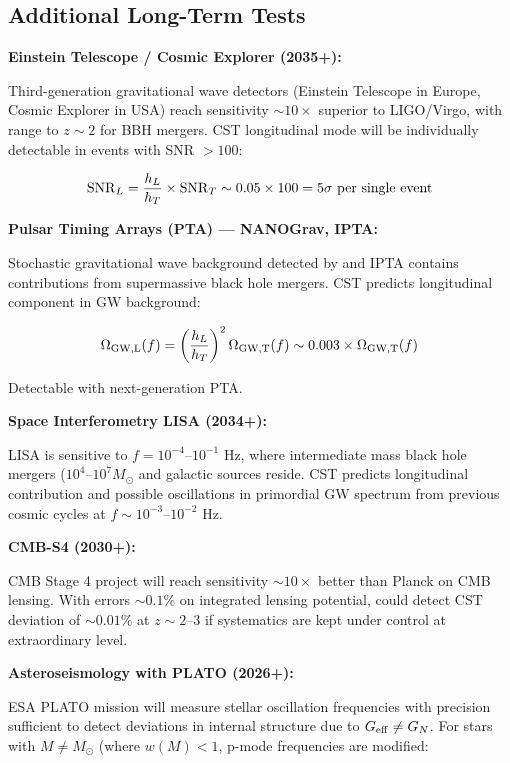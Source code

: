 \documentclass[10pt,a4paper]{article}
\begin{document}
\subsection{Additional Long-Term
Tests}\label{additional-long-term-tests}

\textbf{Einstein Telescope / Cosmic Explorer (2035+):}

Third-generation gravitational wave detectors (Einstein Telescope in
Europe, Cosmic Explorer in USA) reach sensitivity \(\sim 10\times\)
superior to LIGO/Virgo, with range to \(z \sim 2\) for BBH mergers. CST
longitudinal mode will be individually detectable in events with SNR
\(> 100\):

\[{\rm SNR}_L = \frac{h_L}{h_T} \times {\rm SNR}_{T} \sim 0.05 \times 100 = 5\sigma~\text{per single event}\]

\textbf{Pulsar Timing Arrays (PTA) --- NANOGrav, IPTA:}

Stochastic gravitational wave background detected by \cite{NANOGravCollaboration2023} and
IPTA contains contributions from supermassive black hole mergers. CST
predicts longitudinal component in GW background:

\[\Omega_{\rm GW,L}(f) = \left(\frac{h_L}{h_T}\right)^2 \Omega_{\rm GW,T}(f) \sim 0.003 \times \Omega_{\rm GW,T}(f)\]

Detectable with next-generation PTA.

\textbf{Space Interferometry LISA (2034+):}

LISA is sensitive to \(f = 10^{-4}\)--\(10^{-1}\) Hz, where intermediate
mass black hole mergers (\(10^4\)--\(10^7 M_\odot\) and galactic
sources reside. CST predicts longitudinal contribution and possible
oscillations in primordial GW spectrum from previous cosmic cycles at
\(f \sim 10^{-3}\)--\(10^{-2}\) Hz.

\textbf{CMB-S4 (2030+):}

CMB Stage 4 project will reach sensitivity \(\sim 10\times\) better than
Planck on CMB lensing. With errors \(\sim 0.1\%\) on integrated lensing
potential, could detect CST deviation of \(\sim 0.01\%\) at
\(z \sim 2\)--3 if systematics are kept under control at extraordinary
level.

\textbf{Asteroseismology with PLATO (2026+):}

ESA PLATO mission will measure stellar oscillation frequencies with
precision sufficient to detect deviations in internal structure due to
\(G_{\rm eff} \neq G_N\). For stars with \(M \neq M_\odot\) (where
\(w(M) < 1\), p-mode frequencies are modified:
\end{document}
